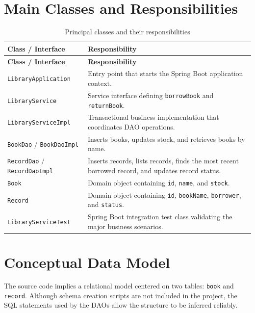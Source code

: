 \documentclass[12pt,a4paper]{report}
\begin{document}
\section{Main Classes and Responsibilities}
\begin{longtable}{p{4.2cm} p{9.5cm}}
    \caption{Principal classes and their responsibilities} \\
    \toprule
    \textbf{Class / Interface} & \textbf{Responsibility} \\
    \midrule
    \endfirsthead
    \toprule
    \textbf{Class / Interface} & \textbf{Responsibility} \\
    \midrule
    \endhead
    \texttt{LibraryApplication} & Entry point that starts the Spring Boot application context. \\
    \texttt{LibraryService} & Service interface defining \texttt{borrowBook} and \texttt{returnBook}. \\
    \texttt{LibraryServiceImpl} & Transactional business implementation that coordinates DAO operations. \\
    \texttt{BookDao} / \texttt{BookDaoImpl} & Inserts books, updates stock, and retrieves books by name. \\
    \texttt{RecordDao} / \texttt{RecordDaoImpl} & Inserts records, lists records, finds the most recent borrowed record, and updates record status. \\
    \texttt{Book} & Domain object containing \texttt{id}, \texttt{name}, and \texttt{stock}. \\
    \texttt{Record} & Domain object containing \texttt{id}, \texttt{bookName}, \texttt{borrower}, and \texttt{status}. \\
    \texttt{LibraryServiceTest} & Spring Boot integration test class validating the major business scenarios. \\
    \bottomrule
\end{longtable}

\section{Conceptual Data Model}
The source code implies a relational model centered on two tables: \texttt{book} and \texttt{record}. Although schema creation scripts are not included in the project, the SQL statements used by the DAOs allow the structure to be inferred reliably.
\end{document}
